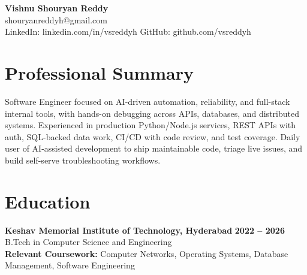 \documentclass[a4paper,11pt]{article}
\newcommand{\resumeSubheading}[4]{%
  \textbf{#1} \hfill \textbf{#2} \\
{#3} \hfill {#4}
}
\begin{document}
\pagestyle{empty}
\raggedbottom
\addtolength{\textheight}{2\baselineskip}
\small

\begin{center}
  {\LARGE \textbf{Vishnu Shouryan Reddy}}\\[0.3em]
  shouryanreddyh@gmail.com \\[0.3em]
  LinkedIn: linkedin.com/in/vsreddyh \textbar{} GitHub: github.com/vsreddyh
\end{center}
\vspace{-0.8em}

\section*{Professional Summary}

Software Engineer focused on AI-driven automation, reliability, and full-stack internal tools, with hands-on debugging across APIs, databases, and distributed systems. Experienced in production Python/Node.js services, REST APIs with auth, SQL-backed data work, CI/CD with code review, and test coverage. Daily user of AI-assisted development to ship maintainable code, triage live issues, and build self-serve troubleshooting workflows.

\section*{Education}

\resumeSubheading
{Keshav Memorial Institute of Technology, Hyderabad}{2022 -- 2026}
{B.Tech in Computer Science and Engineering}{} \\
\textbf{Relevant Coursework:} Computer Networks, Operating Systems, Database Management, Software Engineering


\end{document}
